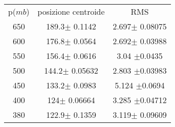 \begin{center}
\begin{tabulary}{\textwidth}{CCC}
\toprule
p($mb$) &  posizione centroide & RMS \\ 
650 &189.3$\pm$ 0.1142& 2.697$\pm$ 0.08075\\
600 &176.8$\pm$ 0.0564& 2.692$\pm$ 0.03988\\
550 &156.4$\pm$ 0.0616& 3.04 $\pm$0.0435\\
500 &144.2$\pm$ 0.05632& 2.803 $\pm$0.03983\\
450 &133.2$\pm$ 0.0983 &5.124 $\pm$0.0694\\
400 &124$\pm$ 0.06664 &3.285 $\pm$0.04712\\
380 &122.9$\pm$ 0.1359& 3.119$\pm$ 0.09609\\
\bottomrule
\end{tabulary}
\end{center}